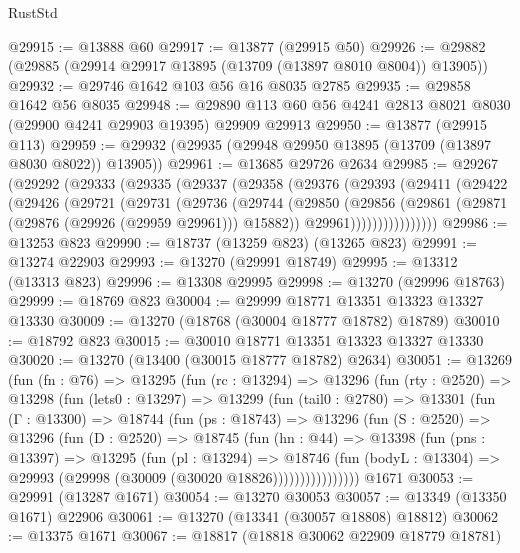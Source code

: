 \begin{lexlean}{RustStd}
\begin{coremodule}
@29915 := @13888 @60
@29917 := @13877 (@29915 @50)
@29926 := @29882 (@29885 (@29914 @29917 @13895 (@13709 (@13897 @8010 @8004)) @13905))
@29932 := @29746 @1642 @103 @56 @16 @8035 @2785
@29935 := @29858 @1642 @56 @8035
@29948 := @29890 @113 @60 @56 @4241 @2813 @8021 @8030 (@29900 @4241 @29903 @19395) @29909 @29913
@29950 := @13877 (@29915 @113)
@29959 := @29932 (@29935 (@29948 @29950 @13895 (@13709 (@13897 @8030 @8022)) @13905))
@29961 := @13685 @29726 @2634
@29985 := @29267
    (@29292
      (@29333
        (@29335
          (@29337
            (@29358
              (@29376
                (@29393
                  (@29411
                    (@29422
                      (@29426
                        (@29721
                          (@29731
                            (@29736
                              (@29744
                                (@29850
                                  (@29856
                                    (@29861 (@29871 (@29876 (@29926 (@29959 @29961))) @15882))
                                    @29961))))))))))))))))
@29986 := @13253 @823
@29990 := @18737 (@13259 @823) (@13265 @823)
@29991 := @13274 @22903
@29993 := @13270 (@29991 @18749)
@29995 := @13312 (@13313 @823)
@29996 := @13308 @29995
@29998 := @13270 (@29996 @18763)
@29999 := @18769 @823
@30004 := @29999 @18771 @13351 @13323 @13327 @13330
@30009 := @13270 (@18768 (@30004 @18777 @18782) @18789)
@30010 := @18792 @823
@30015 := @30010 @18771 @13351 @13323 @13327 @13330
@30020 := @13270 (@13400 (@30015 @18777 @18782) @2634)
@30051 := @13269
    (fun (fn : @76) =>
    @13295
      (fun (rc : @13294) =>
      @13296
        (fun (rty : @2520) =>
        @13298
          (fun (lets0 : @13297) =>
          @13299
            (fun (tail0 : @2780) =>
            @13301
              (fun (Γ : @13300) =>
              @18744
                (fun (ps : @18743) =>
                @13296
                  (fun (S : @2520) =>
                  @13296
                    (fun (D : @2520) =>
                    @18745
                      (fun (hn : @44) =>
                      @13398
                        (fun (pns : @13397) =>
                        @13295
                          (fun (pl : @13294) =>
                          @18746
                            (fun (bodyL : @13304) =>
                            @29993 (@29998 (@30009 (@30020 @18826))))))))))))))))
    @1671
@30053 := @29991 (@13287 @1671)
@30054 := @13270 @30053
@30057 := @13349 (@13350 @1671) @22906
@30061 := @13270 (@13341 (@30057 @18808) @18812)
@30062 := @13375 @1671
@30067 := @18817 (@18818 @30062 @22909 @18779 @18781)

\end{coremodule}
\end{lexlean}
